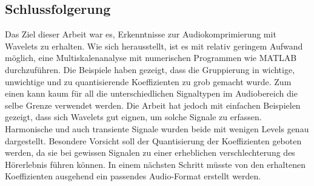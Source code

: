 \begin{refsection}
\section{Schlussfolgerung}
Das Ziel dieser Arbeit war es, Erkenntnisse zur Audiokomprimierung mit Wavelets zu erhalten.
Wie sich herausstellt, ist es mit relativ geringem Aufwand möglich, eine Multiskalenanalyse mit numerischen Programmen wie MATLAB durchzuführen.
Die Beispiele haben gezeigt, dass die Gruppierung in wichtige, unwichtige und zu quantisierende Koeffizienten zu grob gemacht wurde. 
Zum einen kann kaum für all die unterschiedlichen Signaltypen im Audiobereich die selbe Grenze verwendet werden. 
Die Arbeit hat jedoch mit einfachen Beispielen gezeigt, dass sich Wavelets gut eignen, um solche Signale zu erfassen.
Harmonische und auch transiente Signale wurden beide mit wenigen Levels genau dargestellt.
Besondere Vorsicht soll der Quantisierung der Koeffizienten geboten werden, da sie bei gewissen Signalen zu einer erheblichen verschlechterung des Hörerlebnis führen können.
In einem nächsten Schritt müsste von den erhaltenen Koeffizienten ausgehend ein passendes Audio-Format erstellt werden.

\printbibliography[heading=subbibliography]
\end{refsection}
